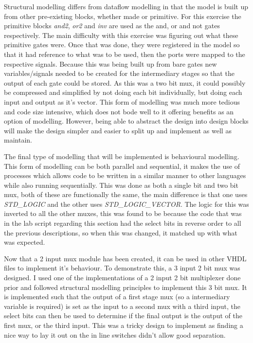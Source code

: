 \documentclass[a4paper, 12pt]{article}
\begin{document}
		Structural modelling differs from dataflow modelling in that the model is built up from other pre-existing blocks, whether made or primitive. For this exercise the primitive blocks \textit{and2}, \textit{or2} and \textit{inv} are used as the and, or and not gates respectively. The main difficulty with this exercise was figuring out what these primitive gates were. Once that was done, they were registered in the model so that it had reference to what was to be used, then the ports were mapped to the respective signals. Because this was being built up from bare gates new variables/signals needed to be created for the intermediary stages so that the output of each gate could be stored. As this was a two bit mux, it could possibly be compressed and simplified by not doing each bit individually, but doing each input and output as it's vector. This form of modelling was much more tedious and code size intensive, which does not bode well to it offering benefits as an option of modelling. However, being able to abstract the design into design blocks will make the design simpler and easier to split up and implement as well as maintain.
		\par
		The final type of modelling that will be implemented is behavioural modelling. This form of modelling can be both parallel and sequential, it makes the use of processes which allows code to be written in a similar manner to other languages while also running sequentially. This was done as both a single bit and two bit mux, both of these are functionally the same, the main difference is that one uses \textit{STD\_LOGIC} and the other uses \textit{STD\_LOGIC\_VECTOR}. The logic for this was inverted to all the other muxes, this was found to be because the code that was  in the lab script regarding this section had the select bits in reverse order to all the previous descriptions, so when this was changed, it matched up with what was expected.
		\par
		Now that a 2 input mux module has been created, it can be used in other VHDL files to implement it's behaviour. To demonstrate this, a 3 input 2 bit mux was designed. I used one of the implementations of a 2 input 2 bit multiplexer done prior and followed structural modelling principles to implement this 3 bit mux. It is implemented such that the output of a first stage mux (so a intermediary variable is required) is set as the input to a second mux with a third input, the select bits can then be used to determine if the final output is the output of the first mux, or the third input. This was a tricky design to implement as finding a nice way to lay it out on the in line switches didn't allow good separation. 
\end{document}
